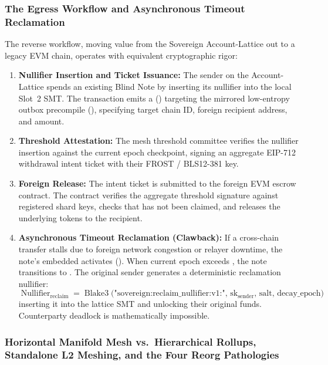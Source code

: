 \documentclass[a4paper,11pt,twoside,parskip=half-,headings=small]{scrartcl}
\begin{document}
\subsubsection{The Egress Workflow and Asynchronous Timeout Reclamation}

The reverse workflow, moving value from the Sovereign Account-Lattice out to a legacy EVM chain, operates with equivalent cryptographic rigor:
\begin{enumerate}[nosep]
  \item \textbf{Nullifier Insertion and Ticket Issuance:} The sender on the Account-Lattice spends an existing Blind Note by inserting its nullifier into the local Slot~2 SMT. The transaction emits a  () targeting the mirrored low-entropy outbox precompile (), specifying target chain ID, foreign recipient address, and amount.
  \item \textbf{Threshold Attestation:} The mesh threshold committee verifies the nullifier insertion against the current epoch checkpoint, signing an aggregate EIP-712 withdrawal intent ticket with their FROST / BLS12-381 key.
  \item \textbf{Foreign Release:} The intent ticket is submitted to the foreign EVM escrow contract. The contract verifies the aggregate threshold signature against registered shard keys, checks that  has not been claimed, and releases the underlying tokens to the recipient.
  \item \textbf{Asynchronous Timeout Reclamation (Clawback):} If a cross-chain transfer stalls due to foreign network congestion or relayer downtime, the note's embedded  activates (). When current epoch exceeds , the note transitions to . The original sender generates a deterministic reclamation nullifier:
  \begin{equation}
    \operatorname{Nullifier}_{\text{reclaim}} = \operatorname{Blake3}\bigl(\text{"sovereign:reclaim\_nullifier:v1:"},\, \text{sk}_{\text{sender}},\, \text{salt},\, \text{decay\_epoch}\bigr)
  \end{equation}
  inserting it into the lattice SMT and unlocking their original funds. Counterparty deadlock is mathematically impossible.
\end{enumerate}

\subsubsection{Horizontal Manifold Mesh vs.\ Hierarchical Rollups, Standalone L2 Meshing, and the Four Reorg Pathologies}
\label{sec:reorg_pathologies_and_probing}
\end{document}
